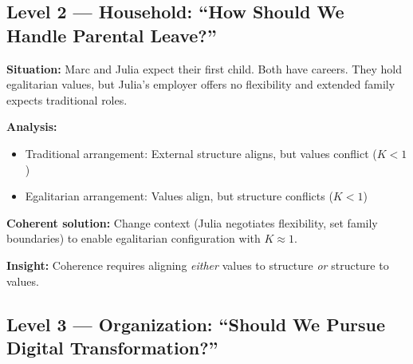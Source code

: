 \subsection{Level 2 — Household: ``How Should We Handle Parental Leave?''}

\begin{tcolorbox}[colback=orange!5!white, colframe=orange!75!black,
    title=\textbf{Worked Example L=2: Household Coordination}]

\textbf{Situation:} Marc and Julia expect their first child. Both have careers.
They hold egalitarian values, but Julia's employer offers no flexibility
and extended family expects traditional roles.

\textbf{Analysis:}
\begin{itemize}[nosep]
    \item Traditional arrangement: External structure aligns, but values conflict ($K < 1$)
    \item Egalitarian arrangement: Values align, but structure conflicts ($K < 1$)
\end{itemize}

\textbf{Coherent solution:}
Change context (Julia negotiates flexibility, set family boundaries)
to enable egalitarian configuration with $K \approx 1$.

\textbf{Insight:} Coherence requires aligning \emph{either} values to structure \emph{or} structure to values.

\end{tcolorbox}

\subsection{Level 3 — Organization: ``Should We Pursue Digital Transformation?''}

